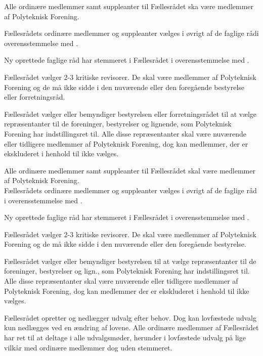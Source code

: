 \begin{list}
 Alle ordinære medlemmer samt suppleanter til Fællesrådet ska være medlemmer af Polyteknisk Forening.

 Fællesrådets ordinære medlemmer og suppleanter vælges i øvrigt af de faglige rådi overensstemmelse med  .

 Ny oprettede faglige råd har stemmeret i Fællesrådet i overensstemmelse med .

\item Fællesrådet vælger 2-3 kritiske revisorer. De skal være medlemmer af Polyteknisk Forening og de må ikke sidde i den nuværende eller den foregående bestyrelse eller forretningsråd. 

\item Fællesrådet vælger eller bemyndiger bestyrelsen eller forretningsrådet til at vælge repræsentanter til de foreninger, bestyrelser og lignende, som Polyteknisk Forening har indstillingsret til. Alle disse repræsentanter skal være nuværende eller tidligere medlemmer af Polyteknisk Forening, dog kan medlemmer, der er ekskluderet i henhold til  ikke vælges.

 Alle ordinære medlemmer samt suppleanter til Fællesrådet skal være medlemmer af Polyteknisk Forening.\\

 Fællesrådets ordinære medlemmer og suppleanter vælges i øvrigt af de faglige råd i overensstemmelse med .

 Ny oprettede faglige råd har stemmeret i Fællesrådet i overensstemmelse med .

\item Fællesrådet vælger 2-3 kritiske revisorer. De skal være medlemmer af Polyteknisk Forening og de må ikke sidde i den nuværende eller den foregående bestyrelse. 

\item Fællesrådet vælger eller bemyndiger bestyrelsen til at vælge repræsentanter til de foreninger, bestyrelser og lign., som Polyteknisk Forening har indstillingsret til. Alle disse repræsentanter skal være nuværende eller tidligere medlemmer af Polyteknisk Forening, dog kan medlemmer der er ekskluderet i henhold til  ikke vælges.

\item Fællesrådet opretter og nedlægger udvalg efter behov. Dog kan lovfæstede udvalg kun nedlægges ved en ændring af lovene. Alle ordinære medlemmer af Fællesrådet har ret til at deltage i alle udvalgsmøder, herunder i lovfæstede udvalg på lige vilkår med ordinære medlemmer dog uden stemmeret.


\end{list}
